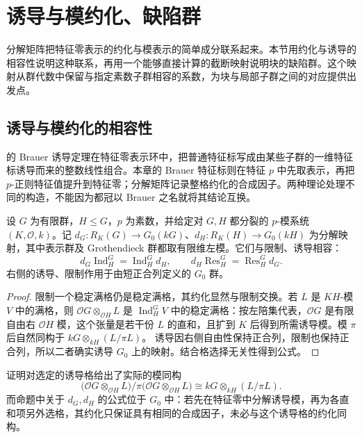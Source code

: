 
\section{诱导与模约化、缺陷群}
\label{b5:sec:0804}


%
%
%

分解矩阵把特征零表示的约化与模表示的简单成分联系起来。本节用约化与诱导的相容性说明这种联系，再用一个能够直接计算的截断映射说明块的缺陷群。这个映射从群代数中保留与指定素数子群相容的系数，为块与局部子群之间的对应提供出发点。

\subsection{诱导与模约化的相容性}
\label{b5:subsec:0804:01}

的 Brauer 诱导定理在特征零表示环中，把普通特征标写成由某些子群的一维特征标诱导而来的整数线性组合。本章的 Brauer 特征标则在特征 \(p\) 中先取表示，再把 \(p\)-正则特征值提升到特征零；分解矩阵记录整格约化的合成因子。两种理论处理不同的构造，不能因为都冠以 Brauer 之名就将其结论互换。
\begin{proposition}\label{b5:prop:reduction-induction}
	设 \(G\) 为有限群，\(H\le G\)，\(p\) 为素数，并给定对 \(G,H\) 都分裂的 \(p\)-模系统 \((K,\mathcal O,k)\)。记 \(d_G:R_K(G)\to G_0(kG)\)、\(d_H:R_K(H)\to G_0(kH)\) 为分解映射，其中表示群及 Grothendieck 群都取有限维左模。它们与限制、诱导相容：
	\[
		d_G\operatorname{Ind}_H^G =\operatorname{Ind}_H^Gd_H,\qquad d_H\operatorname{Res}_H^G =\operatorname{Res}_H^Gd_G.
	\]
	右侧的诱导、限制作用于由短正合列定义的 \(G_0\) 群。
\end{proposition}
\begin{proof}
	限制一个稳定满格仍是稳定满格，其约化显然与限制交换。若 \(L\) 是 \(KH\)-模 \(V\) 中的满格，则 \(\mathcal OG\otimes_{\mathcal OH}L\) 是 \(\operatorname{Ind}_H^G V\) 中的稳定满格：按左陪集代表，\(\mathcal OG\) 是有限自由右 \(\mathcal OH\) 模，这个张量是若干份 \(L\) 的直和，且扩到 \(K\) 后得到所需诱导模。模 \(\pi\) 后自然同构于 \(kG\otimes_{kH}(L/\pi L)\)。 诱导因右侧自由性保持正合列，限制也保持正合列，所以二者确实诱导 \(G_0\) 上的映射。结合格选择无关性得到公式。
\end{proof}
证明对选定的诱导格给出了实际的模同构
\[
	\bigl(\mathcal OG\otimes_{\mathcal OH}L\bigr)/\pi\bigl(\mathcal OG\otimes_{\mathcal OH}L\bigr) \cong kG\otimes_{kH}(L/\pi L).
\]
而命题中关于 \(d_G,d_H\) 的公式位于 \(G_0\) 中：若先在特征零中分解诱导模，再为各直和项另外选格，其约化只保证具有相同的合成因子，未必与这个诱导格的约化同构。

